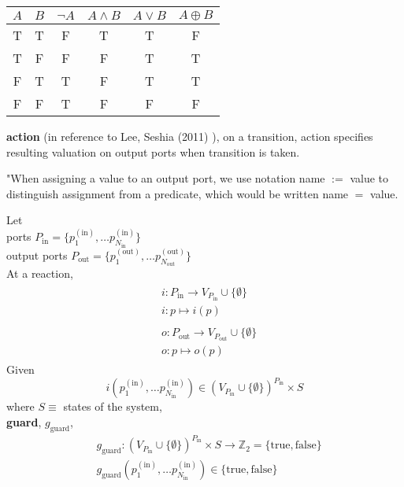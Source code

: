 \documentclass[10pt]{amsart}
\begin{document}
\begin{multicols*}{2}
\begin{tabular}{c c c c c c}
\hline
$A$ & $B$ & $\neg A$ & $ A\wedge B$ & $A \vee B$ & $A \oplus B$ \\ \hline
T & T & F & T & T & F  \\
T & F & F & F & T & T \\ 
F & T & T & F & T & T \\ 
F & F & T & F & F & F  
\end{tabular}


\textbf{action} (in reference to Lee, Seshia (2011) \cite{LeSe2017}), on a transition, action specifies resulting valuation on output ports when transition is taken.  

"When assigning a value to an output port, we use notation name $:=$ value to distinguish assignment from a predicate, which would be written name $=$ value.  

Let \\
ports $P_{\text{in}} = \lbrace p_1^{(\text{in})}, \dots p_{N_{\text{in}}}^{(\text{in})}  \rbrace$ \\
output ports $P_{\text{out}} = \lbrace p_1^{(\text{out})}, \dots p_{N_{\text{out}}}^{(\text{out})}  \rbrace$ \\

At a reaction, 
\begin{equation}
\begin{gathered}
\begin{aligned}
& i: P_{\text{in}} \to V_{P_{\text{in}}} \cup \lbrace \emptyset \rbrace \\
& i: p \mapsto i(p) 
\end{aligned} \\
\begin{aligned}
& o: P_{\text{out}} \to V_{P_{\text{out}}} \cup \lbrace \emptyset \rbrace \\ 
& o: p \mapsto o(p)	
\end{aligned}
\end{gathered}
\end{equation}
Given 
\[
i(p_1^{(\text{in})}, \dots p_{N_{\text{in}}}^{(\text{in}) } )  \in ( V_{P_{\text{in}}} \cup \lbrace \emptyset \rbrace )^{P_{\text{in}} } \times S
\]
where $S \equiv $ states of the system,  \\

\textbf{guard}, $g_{\text{guard}}$, 
\begin{equation}
\begin{aligned}
& g_{\text{guard}} : ( V_{P_{\text{in}}} \cup \lbrace \emptyset \rbrace )^{P_{\text{in}} } \times S \to \mathbb{Z}_2 = \lbrace \text{true}, \text{false} \rbrace \\ 
& g_{\text{guard}}( p_1^{(\text{in})}, \dots p_{N_{\text{in}}}^{(\text{in})} ) \in \lbrace \text{true}, \text{false} \rbrace 
\end{aligned}
\end{equation}


\end{multicols*}
\end{document}
